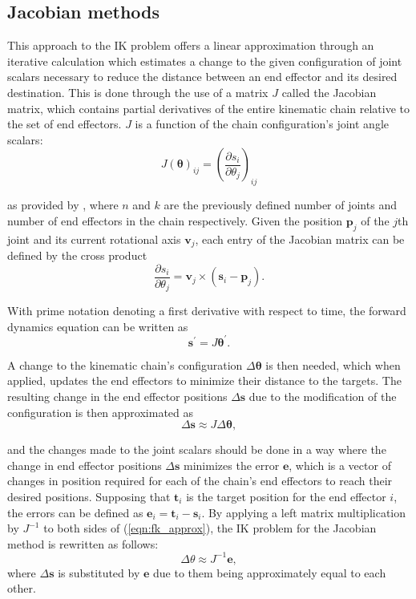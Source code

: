\subsection{Jacobian methods}
This approach to the IK problem \cite{BALESTRINO19842435, wolovich, Baillieul} offers
a linear approximation through an iterative calculation which estimates a change
to the given configuration of joint scalars necessary to reduce the distance
between an end effector and its desired destination. This is done through the
use of a matrix \(J\) called the Jacobian matrix, which contains partial
derivatives of the entire kinematic chain relative to the set of end effectors.
\(J\) is a function of the chain configuration's joint angle scalars:
\begin{equation}
    J(\bm{\theta})_{ij} = \left(\frac{\partial s_i}{\partial
    \theta_j}\right)_{ij}
\end{equation}

\noindent as provided by \cite{rbuss_ik_survey}, where \(n\) and \(k\) are the
previously defined number of joints and number of end effectors in the chain
respectively. Given the position \(\mathbf{p}_j\) of the \(j\)th joint and its
current rotational axis \(\mathbf{v}_j\), each entry of the Jacobian matrix can
be defined by the cross product
\begin{equation}
    \frac{\partial s_i}{\partial \theta_j} = \mathbf{v}_j \times (\mathbf{s}_i
    - \mathbf{p}_j).
\end{equation}

With prime notation denoting a first derivative with respect to time, the
forward dynamics equation can be written as
\begin{equation}
    \mathbf{s}^\prime = J\bm{\theta}^\prime.
\end{equation}

A change to the kinematic chain's configuration \(\Delta \bm{\theta}\) is then
needed, which when applied, updates the end effectors to minimize their distance
to the targets. The resulting change in the end effector positions \(\Delta
\mathbf{s}\) due to the modification of the configuration is then approximated
as
\begin{equation}
    \Delta \mathbf{s} \approx J \Delta \bm{\theta},
    \label{eqn:fk_approx}
\end{equation}

\noindent and the changes made to the joint scalars should be done in a way
where the change in end effector positions \(\Delta\mathbf{s}\) minimizes the
error \(\mathbf{e}\), which is a vector of changes in position required for each
of the chain's end effectors to reach their desired positions. Supposing that
\(\mathbf{t}_i\) is the target position for the end effector \(i\), the errors
can be defined as \(\mathbf{e}_i = \mathbf{t}_i - \mathbf{s}_i\). By applying a left
matrix multiplication by \(J^{-1}\) to both sides of (\ref{eqn:fk_approx}), the
IK problem for the Jacobian method is rewritten as follows: 
\begin{equation} 
    \Delta \theta \approx J^{-1}\mathbf{e},
\end{equation}
\noindent where \(\Delta\mathbf{s}\) is substituted by \(\mathbf{e}\) due to
them being approximately equal to each other.

